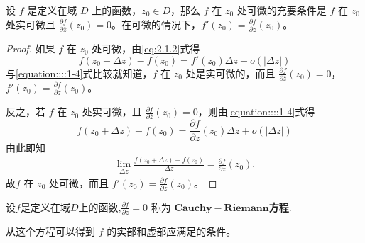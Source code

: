 \documentclass[../../main.tex]{subfiles}
\begin{document}
\begin{theorem}\label{theorem:复变函数可微的充要条件1}
设 \( f \) 是定义在域 \( D \) 上的函数，\( z_0 \in D \)，那么 \( f \) 在 \( z_0 \) 处可微的充要条件是 \( f \) 在 \( z_0 \) 处实可微且 \( \frac{\partial f}{\partial \overline{z}}(z_0) = 0 \)。在可微的情况下，\( f'(z_0) = \frac{\partial f}{\partial z}(z_0) \)。
\end{theorem}
\begin{proof}
如果 \( f \) 在 \( z_0 \) 处可微，由\eqref{eq:2.1.2}式得
\[
f(z_0 + \Delta z) - f(z_0) = f'(z_0)\Delta z + o(|\Delta z|)
\]
与\eqref{equation::::1-4}式比较就知道，\( f \) 在 \( z_0 \) 处是实可微的，而且 \( \frac{\partial f}{\partial \overline{z}}(z_0) = 0 \)，\( f'(z_0) = \frac{\partial f}{\partial z}(z_0) \)。

反之，若 \( f \) 在 \( z_0 \) 处实可微，且 \( \frac{\partial f}{\partial \overline{z}}(z_0) = 0 \)，则由\eqref{equation::::1-4}式得
\[
f(z_0 + \Delta z) - f(z_0) = \frac{\partial f}{\partial z}(z_0)\Delta z + o(|\Delta z|)
\]
由此即知 
\begin{align*}
\underset{\Delta z}{\lim}\frac{f\left( z_0+\Delta z \right) -f\left( z_0 \right)}{\Delta z}=\frac{\partial f}{\partial z}\left( z_0 \right).
\end{align*}
故\( f \) 在 \( z_0 \) 处可微，而且 \( f'(z_0) = \frac{\partial f}{\partial z}(z_0) \)。 

\end{proof}

\begin{definition}
设$f$是定义在域$D$上的函数,$\frac{\partial f}{\partial \overline{z}} = 0$ 称为 $\mathbf{Cauchy}-\mathbf{Riemann}$\textbf{方程}.
\end{definition}
\begin{note}
从这个方程可以得到 $f$ 的实部和虚部应满足的条件。
\end{note}
\end{document}
